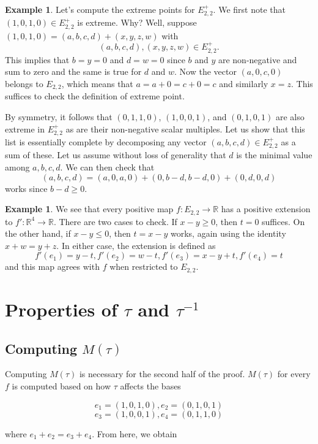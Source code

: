 \documentclass[11pt]{amsart}
\theoremstyle{definition}
\newtheorem{example}[thm]{Example}
\def\bb{\mathbb}
\begin{document}
\begin{example}
    Let's compute the extreme points for $E_{2,2}^+$. We first note that $(1,0,1,0)\in E_{2,2}^+$ is extreme. Why? Well, suppose $(1,0,1,0) = (a,b,c,d) + (x,y,z,w)$ with \[(a,b,c,d),(x,y,z,w)\in E_{2,2}^+.\] This implies that $b=y=0$ and $d=w=0$ since $b$ and $y$ are non-negative and sum to zero and the same is true for $d$ and $w$. Now the vector $(a,0,c,0)$ belongs to $E_{2,2}$, which means that $a = a+0 = c+0 = c$ and similarly $x=z$. This suffices to check the definition of extreme point.

    By symmetry, it follows that $(0,1,1,0)$, $(1,0,0,1)$, and $(0,1,0,1)$ are also extreme in $E_{2,2}^+$ as are their non-negative scalar multiples. Let us show that this list is essentially complete by decomposing any vector $(a,b,c,d)\in E_{2,2}^+$ as a sum of these. Let us assume without loss of generality that $d$ is the minimal value among $a,b,c,d$. We can then check that 
    \[(a,b,c,d) = (a,0,a,0) + (0,b-d,b-d,0) + (0,d,0,d)\]
    works since $b-d\geq 0$.
\end{example}

\begin{example}
    We see that every positive map $f:E_{2,2}\to \bb R$ has a positive extension to $f': \bb R^4\to \bb R$. There are two cases to check. If $x-y\geq 0$, then $t=0$ suffices. On the other hand, if $x-y\leq 0$, then $t = x-y$ works, again using the identity $x+w = y+z$. In either case, the extension is defined as 
    \[f'(e_1) = y-t, f'(e_2) = w-t, f'(e_3) = x-y+t, f'(e_4) =t\]
    and this map agrees with $f$ when restricted to $E_{2,2}$.
\end{example}

\section{Properties of $\tau$ and $\tau^{-1}$}

\subsection{Computing \(M(\tau)\)}

Computing \(M(\tau)\) is necessary for the second half of the proof. \(M(\tau)\) for every $f$ is computed based on how \(\tau\) affects the bases

\[
e_1 = (1,0,1,0), e_2 = (0,1,0,1) \]
\[
e_3 = (1,0,0,1), e_4 = (0,1,1,0)
\]

where $e_1 + e_2 = e_3 + e_4$. From here, we obtain
\end{document}
